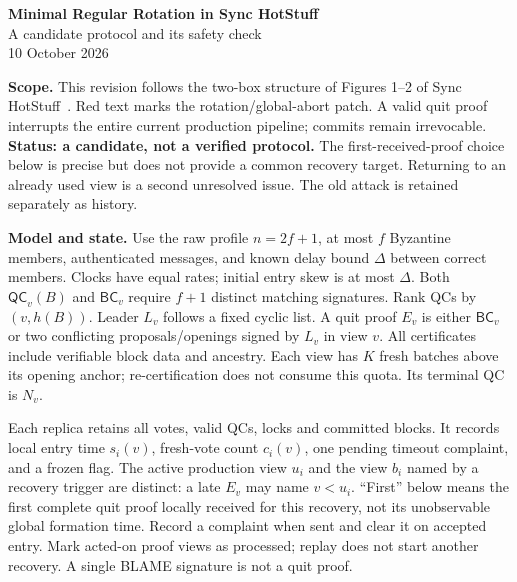 \documentclass[10pt,a4paper]{article}
\newcommand{\QC}{\mathsf{QC}}
\newcommand{\BC}{\mathsf{BC}}
\newcommand{\chg}[1]{\textcolor{red!70!black}{#1}}
\begin{document}
\begin{center}
{\Large\bfseries Minimal Regular Rotation in Sync HotStuff}\\[3pt]
{\large A candidate protocol and its safety check}\\[3pt]
10 October 2026
\end{center}

\textbf{Scope.} This revision follows the two-box structure of Figures 1--2
of Sync HotStuff~\cite{sync}. \chg{Red text marks the rotation/global-abort
patch.} A valid quit proof interrupts the entire current production pipeline;
commits remain irrevocable. \textbf{Status: a candidate, not a verified
protocol.} The first-received-proof choice below is precise but does not
provide a common recovery target. Returning to an already used view is a
second unresolved issue. The old attack is retained separately as history.

\textbf{Model and state.} Use the raw profile $n=2f+1$, at most $f$
Byzantine members, authenticated messages, and known delay bound $\Delta$
between correct members. Clocks have equal rates; initial entry skew is at
most $\Delta$. Both $\QC_v(B)$ and $\BC_v$ require $f+1$ distinct matching
signatures. Rank QCs by $(v,h(B))$. Leader $L_v$ follows a fixed cyclic list.
A quit proof $E_v$ is either $\BC_v$ or two conflicting proposals/openings
signed by $L_v$ in view $v$. All certificates include verifiable block data
and ancestry. Each view has $K$ fresh batches above its opening anchor;
re-certification does not consume this quota. Its terminal QC is $N_v$.

Each replica retains all votes, valid QCs, locks and committed blocks.
It records local entry time $s_i(v)$, fresh-vote count $c_i(v)$, one pending
timeout complaint, and a frozen flag. \chg{The active production view $u_i$
and the view $b_i$ named by a recovery trigger are distinct: a late $E_v$
may name $v<u_i$. ``First'' below means the first complete quit proof
locally received for this recovery, not its unobservable global formation
time.} Record a complaint when sent and clear it on accepted entry.
Mark acted-on proof views as processed; replay does not start another recovery.
A single BLAME signature is not a quit proof.
\end{document}
